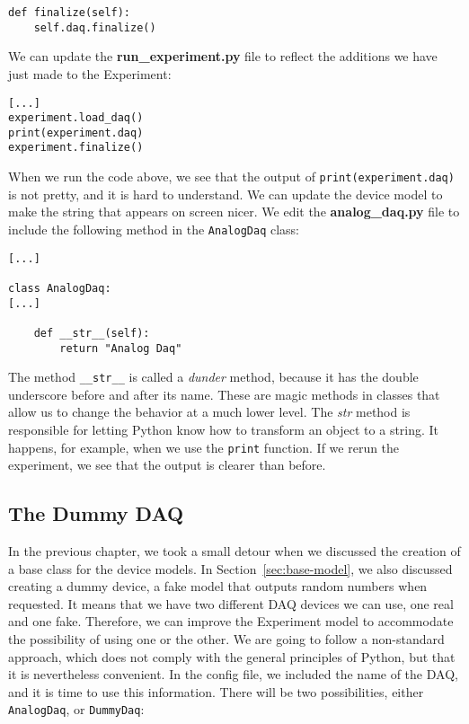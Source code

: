 \begin{verbatim}
def finalize(self):
    self.daq.finalize()
\end{verbatim}

We can update the \textbf{run\_experiment.py} file to reflect the additions we have just made to the Experiment:

\begin{verbatim}
[...]
experiment.load_daq()
print(experiment.daq)
experiment.finalize()
\end{verbatim}

When we run the code above, we see that the output of \texttt{print(experiment.daq)} is not pretty, and it is hard to understand. We can update the device model to make the string that appears on screen nicer. We edit the \textbf{analog\_daq.py} file to include the following method in the \texttt{AnalogDaq} class:

\begin{verbatim}
[...]

class AnalogDaq:
[...]

    def __str__(self):
        return "Analog Daq"
\end{verbatim}

The method \texttt{\_\_str\_\_} is called a \emph{dunder} method, because it has the double underscore before and after its name. These are magic methods in classes that allow us to change the behavior at a much lower level. The \emph{str} method is responsible for letting Python know how to transform an object to a string. It happens, for example, when we use the \texttt{print} function. If we rerun the experiment, we see that the output is clearer than before.


\subsection{The Dummy DAQ}\label{subsec:loading-dummy-daq}
In the previous chapter, we took a small detour when we discussed the creation of a base class for the device models. In Section~\ref{sec:base-model}, we also discussed creating a dummy device, a fake model that outputs random numbers when requested. It means that we have two different DAQ devices we can use, one real and one fake. Therefore, we can improve the Experiment model to accommodate the possibility of using one or the other. We are going to follow a non-standard approach, which does not comply with the general principles of Python, but that it is nevertheless convenient. In the config file, we included the name of the DAQ, and it is time to use this information. There will be two possibilities, either \texttt{AnalogDaq}, or \texttt{DummyDaq}:

